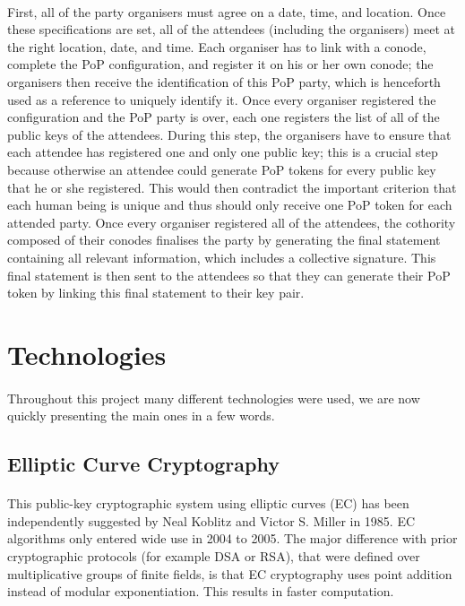 \paragraph{}
First, all of the party organisers must agree on a date, time, and location. Once these specifications are set, all of the attendees (including the organisers) meet at the right location, date, and time. Each organiser has to link with a conode, complete the PoP configuration, and register it on his or her own conode; the organisers then receive the identification of this PoP party, which is henceforth used as a reference to uniquely identify it. Once every organiser registered the configuration and the PoP party is over, each one registers the list of all of the public keys of the attendees. During this step, the organisers have to ensure that each attendee has registered one and only one public key; this is a crucial step because otherwise an attendee could generate PoP tokens for every public key that he or she registered. This would then contradict the important criterion that each human being is unique and thus should only receive one PoP token for each attended party. Once every organiser registered all of the attendees, the cothority composed of their conodes finalises the party by generating the final statement containing all relevant information, which includes a collective signature. This final statement is then sent to the attendees so that they can generate their PoP token by linking this final statement to their key pair.

\section{Technologies}

\paragraph{}
Throughout this project many different technologies were used, we are now quickly presenting the main ones in a few words.

\subsection[Elliptic Curve Cryptography]{Elliptic Curve Cryptography\raisebox{.3\baselineskip}{\normalsize\footnotemark}}

\paragraph{}
This public-key cryptographic system using elliptic curves (EC) has been independently suggested by Neal Koblitz and Victor S. Miller in 1985. EC algorithms only entered wide use in 2004 to 2005. The major difference with prior cryptographic protocols (for example DSA or RSA), that were defined over multiplicative groups of finite fields, is that EC cryptography uses point addition instead of modular exponentiation. This results in faster computation.

